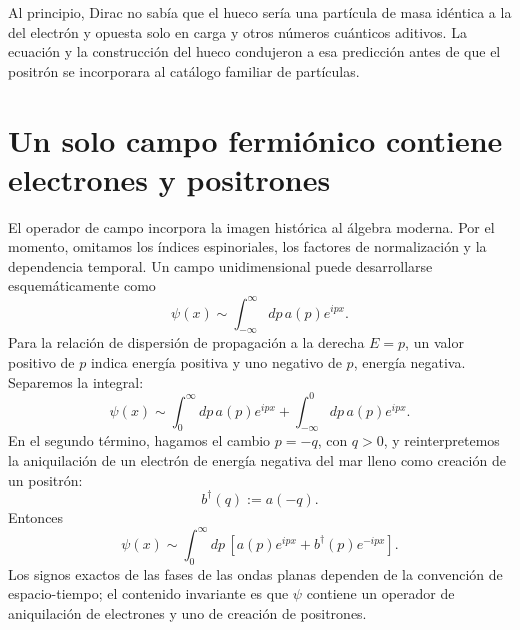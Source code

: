 \begin{classroomqa}
\end{classroomqa}

Al principio, Dirac no sabía que el hueco sería una partícula de masa idéntica a la del electrón y opuesta solo en carga y otros números cuánticos aditivos. La ecuación y la construcción del hueco condujeron a esa predicción antes de que el positrón se incorporara al catálogo familiar de partículas.

\section{Un solo campo fermiónico contiene electrones y positrones}

El operador de campo incorpora la imagen histórica al álgebra moderna. Por el momento, omitamos los índices espinoriales, los factores de normalización y la dependencia temporal. Un campo unidimensional puede desarrollarse esquemáticamente como
\begin{equation}
\psi(x)
\sim
\int_{-\infty}^{\infty}dp\,a(p)e^{ipx}.
\label{eq:l10-full-field-integral}
\end{equation}
Para la relación de dispersión de propagación a la derecha \(E=p\), un valor positivo de \(p\) indica energía positiva y uno negativo de \(p\), energía negativa. Separemos la integral:
\begin{equation}
\psi(x)
\sim
\int_0^\infty dp\,a(p)e^{ipx}
+
\int_{-\infty}^0 dp\,a(p)e^{ipx}.
\end{equation}
En el segundo término, hagamos el cambio \(p=-q\), con \(q>0\), y reinterpretemos la aniquilación de un electrón de energía negativa del mar lleno como creación de un positrón:
\begin{equation}
b^\dagger(q):=a(-q).
\end{equation}
Entonces
\begin{equation}
\psi(x)
\sim
\int_0^\infty dp\,
\left[
a(p)e^{ipx}
+
b^\dagger(p)e^{-ipx}
\right].
\label{eq:l10-electron-positron-split}
\end{equation}
Los signos exactos de las fases de las ondas planas dependen de la convención de espacio-tiempo; el contenido invariante es que \(\psi\) contiene un operador de aniquilación de electrones y uno de creación de positrones.

